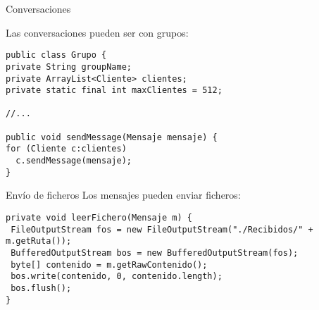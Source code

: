 \documentclass[compress]{beamer}
\begin{document}
\begin{frame}[fragile]{Conversaciones}

  Las conversaciones pueden ser con grupos:
\begin{lstlisting}
public class Grupo {
private String groupName;
private ArrayList<Cliente> clientes;
private static final int maxClientes = 512;

//...

public void sendMessage(Mensaje mensaje) {
for (Cliente c:clientes)
  c.sendMessage(mensaje);
}
\end{lstlisting}
\end{frame}

\begin{frame}[fragile]{Envío de ficheros}
  Los mensajes pueden enviar ficheros:
  \begin{lstlisting}
private void leerFichero(Mensaje m) {
 FileOutputStream fos = new FileOutputStream("./Recibidos/" + m.getRuta());
 BufferedOutputStream bos = new BufferedOutputStream(fos);
 byte[] contenido = m.getRawContenido();
 bos.write(contenido, 0, contenido.length);
 bos.flush();
}
  \end{lstlisting}

\end{frame}
\end{document}
